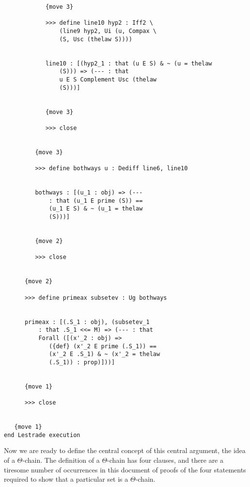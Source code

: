 \documentclass[12pt]{article}
\begin{document}
\begin{verbatim}
            {move 3}

            >>> define line10 hyp2 : Iff2 \
                (line9 hyp2, Ui (u, Compax \
                (S, Usc (thelaw S))))


            line10 : [(hyp2_1 : that (u E S) & ~ (u = thelaw 
                (S))) => (--- : that 
                u E S Complement Usc (thelaw 
                (S)))]


            {move 3}

            >>> close


         {move 3}

         >>> define bothways u : Dediff line6, line10


         bothways : [(u_1 : obj) => (--- 
             : that (u_1 E prime (S)) == 
             (u_1 E S) & ~ (u_1 = thelaw 
             (S)))]


         {move 2}

         >>> close


      {move 2}

      >>> define primeax subsetev : Ug bothways


      primeax : [(.S_1 : obj), (subsetev_1 
          : that .S_1 <<= M) => (--- : that 
          Forall ([(x'_2 : obj) => 
             ({def} (x'_2 E prime (.S_1)) == 
             (x'_2 E .S_1) & ~ (x'_2 = thelaw 
             (.S_1)) : prop)]))]


      {move 1}

      >>> close


   {move 1}
end Lestrade execution
\end{verbatim}

Now we are ready to define the central concept of this central argument, the idea of a $\Theta$-chain.  The definition of a $\Theta$-chain has four clauses, and there are a tiresome number of occurrences in this document of proofs of the four statements required to show that a particular set is a $\Theta$-chain.
\end{document}

